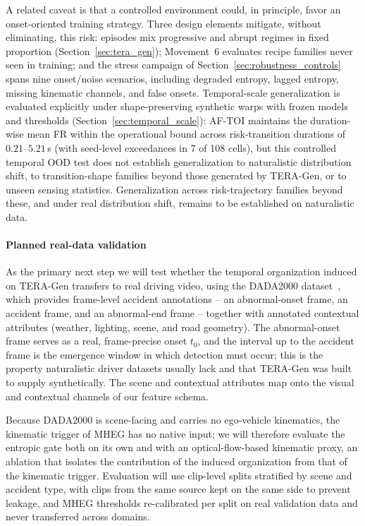 \documentclass[a4paper,fleqn]{cas-dc}
\newcommand{\TERAGen}{\mbox{TERA-Gen}\xspace}
\newcommand{\MHEG}{\mbox{MHEG}\xspace}
\begin{document}
{\color{\revcolor}A related caveat is that a controlled environment could, in
principle, favor an onset-oriented training strategy. Three design elements
mitigate, without eliminating, this risk: episodes mix progressive and abrupt
regimes in fixed proportion (Section~\ref{sec:tera_gen}); Movement~6 evaluates
recipe families never seen in training; and the stress campaign of
Section~\ref{sec:robustness_controls} spans nine onset/noise scenarios,
including degraded entropy, lagged entropy, missing kinematic channels, and
false onsets. Temporal-scale generalization is evaluated explicitly under
shape-preserving synthetic warps with frozen models and thresholds
(Section~\ref{sec:temporal_scale}): \mbox{AF-TOI} maintains the
duration-wise mean FR within the operational bound across risk-transition
durations of $0.21$--$5.21$\,s (with seed-level exceedances in 7 of 108
cells), but this controlled temporal OOD test does not establish
generalization to naturalistic distribution shift, to transition-shape
families beyond those generated by \TERAGen, or to unseen sensing
statistics. Generalization across risk-trajectory families beyond these, and
under real distribution shift, remains to be established on naturalistic
data.}
\paragraph{Planned real-data validation}
As the primary next step we will test whether the temporal organization induced
on \TERAGen transfers to real driving video, using the
DADA2000 dataset~\cite{fang2022dada}, which provides frame-level accident
annotations -- an abnormal-onset frame, an accident frame, and an abnormal-end
frame -- together with annotated contextual attributes (weather, lighting, scene,
and road geometry). The abnormal-onset frame serves as a real, frame-precise
onset $t_0$, and the interval up to the accident frame is the emergence window in
which detection must occur; this is the property naturalistic driver datasets
usually lack and that \TERAGen was built to supply synthetically. The scene and
contextual attributes map onto the visual and contextual channels of our feature
schema.

Because DADA2000 is scene-facing and carries no ego-vehicle kinematics,
the kinematic trigger of \MHEG has no native input; we will therefore evaluate the
entropic gate both on its own and with an optical-flow-based kinematic proxy, an
ablation that isolates the contribution of the induced organization from that of
the kinematic trigger. Evaluation will use clip-level splits stratified by scene and
accident type, with clips from the same source kept on the same side to prevent
leakage, and \MHEG thresholds re-calibrated per split on real validation data and
never transferred across domains.
\end{document}

